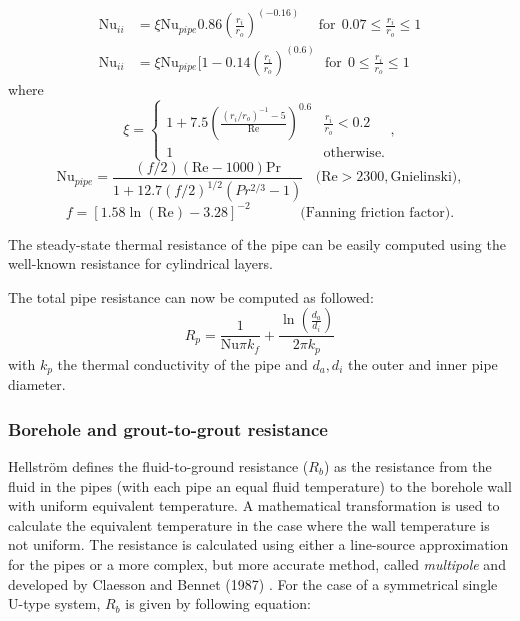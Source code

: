 \documentclass[a4paper,oneside,11pt]{report}
\begin{document}
\begin{align} \label{eq:bf_Pet}
\text{Nu}_{ii} &= \xi \text{Nu}_{pipe} 0.86 \left(\frac{r_i}{r_o}\right)^{(-0.16)} \ \ \ \ \ \ \text{for} \ \ 0.07 \leq \frac{r_i}{r_o} \leq 1 \\
\text{Nu}_{ii} &= \xi \text{Nu}_{pipe} [1-0.14 \left(\frac{r_i}{r_o}\right)^{(0.6)}  \ \ \ \text{for}  \ \ 0 \leq \frac{r_i}{r_o} \leq 1
\end{align}
where
\begin{equation*}
  \xi = \begin{cases}
    1 + 7.5 \left( \frac{(r_i/r_o)^{-1} - 5}{\text{Re}} \right)^{0.6} & \frac{r_i}{r_o} < 0.2 \\
    1 & \text{otherwise}.
  \end{cases},
\end{equation*}
\begin{equation*}
  \text{Nu}_{pipe} = \frac{ (f/2) (\text{Re} - 1000) \text{Pr} }{1 + 12.7 (f/2)^{1/2}(Pr^{2/3} - 1)} \ \ \ \ \text{(Re} > 2300, \text{Gnielinski}),
\end{equation*}
\begin{equation*}
  f = [ 1.58 \ln( \text{Re} ) - 3.28 ]^{-2} \ \ \ \ \ \ \ \ \ \ \ \ \ \ \ \ \text{(Fanning friction factor).}
\end{equation*}

The steady-state thermal resistance of the pipe can be easily computed using the well-known resistance for cylindrical layers.

The total pipe resistance can now be computed as followed:
\begin{equation} \label{eq:bf_Rp}
	R_{p} = \frac{1}{\text{Nu} \pi k_{f} } + \frac{ \ln \left( \frac{d_a}{d_i} \right) }{2 \pi k_{p} }
\end{equation}
with $k_p$ the thermal conductivity of the pipe and $d_a, d_i$ the outer and inner pipe diameter.


\subsubsection{Borehole and grout-to-grout resistance} \label{sssec:bf_RbRa}

Hellstr\"om defines the fluid-to-ground resistance ($R_b$) as the resistance from the fluid in the pipes (with each pipe an equal fluid temperature) to the borehole wall with uniform equivalent temperature. A mathematical transformation is used to calculate the equivalent temperature in the case where the wall temperature is not uniform. The resistance is calculated using either a line-source approximation for the pipes or a more complex, but more accurate method, called \textit{multipole} and developed by Claesson and Bennet (1987) \cite{hel91}. For the case of a symmetrical single U-type system, $R_b$ is given by following equation:
\end{document}

